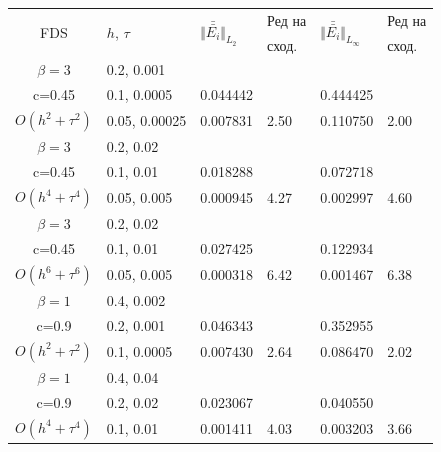 \documentclass{article}
\begin{document}
\begin{table}[ht]
\centering
\small
		\begin{tabular}{||c|l|ll|ll||}
			\hline
			\hline
      \multirow{2  }{*}{FDS}        & \multirow{2  }{*}{$h$, $\tau$}  &  	\multirow{2  }{*}{ $\Vert \bar{\bar{ E_i}} \Vert_{L_2}$ }	&Ред на	& \multirow{2  }{*}{ $\Vert \bar{\bar{ E_i}} \Vert_{L_\infty}$ } 		&Ред на   \\
	                                        &                                                & 							 					&  сход. 	& 								       					& сход. \\
   			\hline 
					\hline 
  $\beta=3$                &0.2, 0.001         &              &            &                     &      \\
   c=0.45                     &0.1, 0.0005         &0.044442  &            &0.444425 &       \\
     $O(h^2 + \tau^ 2)$ &0.05, 0.00025  & 0.007831 & 2.50      & 0.110750     & 2.00      \\
			\hline 
  $\beta=3$               &0.2, 0.02       &                &            &                     &      \\
   c=0.45                    &0.1, 0.01      &0.018288 &            &0.072718   &       \\
     $O(h^4+ \tau^4)$ &0.05, 0.005  &0.000945 &4.27    &0.002997   &4.60      \\
			\hline 
  $\beta=3$               &0.2, 0.02       &                &            &                      &            \\
     c=0.45                 &0.1, 0.01        &0.027425 &            &  0.122934    &           \\
     $O(h^6+ \tau^6)$ &0.05, 0.005 &0.000318 & 6.42     & 0.001467     &6.38   \\
	   \hline
			\hline 
       $\beta=1$       &0.4, 0.002        &             &            &           &   \\
                  c=0.9    &0.2, 0.001       &  0.046343   &            &0.352955 &   \\
  $O(h^2+ \tau^2)$ &0.1, 0.0005   &0.007430   &2.64  &0.086470  & 2.02 \\
			\hline
      $\beta=1$               &0.4, 0.04    &            &               &             &    \\
       c=0.9                     &0.2, 0.02     & 0.023067   &        &  0.040550   &   \\
       $O(h^4+ \tau^4)$ &0.1, 0.01   &0.001411 & 4.03   & 0.003203  & 3.66  \\

\end{tabular}
\end{table}
\end{document}
